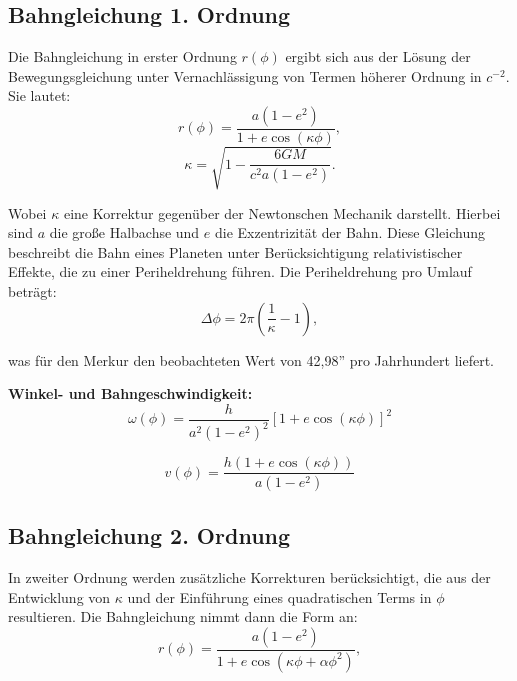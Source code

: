 \subsection{Bahngleichung 1. Ordnung}
Die Bahngleichung in erster Ordnung $r(\phi)$ ergibt sich aus der Lösung der Bewegungsgleichung unter Vernachlässigung von Termen höherer Ordnung in $c^{-2}$. Sie lautet:
\begin{equation}
    \label{eq:weber_r_1_ordnung}
    r(\phi) = \frac{a(1 - e^2)}{1 + e \cos(\kappa \phi)},    
\end{equation}
\begin{equation}
    \kappa = \sqrt{1 - \frac{6GM}{c^2 a(1 - e^2)}}.
\end{equation}

Wobei $\kappa$ eine Korrektur gegenüber der Newtonschen Mechanik darstellt. Hierbei sind $a$ die große Halbachse und $e$ die Exzentrizität der Bahn.
Diese Gleichung beschreibt die Bahn eines Planeten unter Berücksichtigung relativistischer Effekte, die zu einer Periheldrehung führen.
Die Periheldrehung pro Umlauf beträgt:
\begin{equation}
    \Delta \phi = 2\pi \left(\frac{1}{\kappa} - 1\right),
\end{equation}

was für den Merkur den beobachteten Wert von 42,98'' pro Jahrhundert liefert.

\textbf{Winkel- und Bahngeschwindigkeit:}
\begin{equation}
    \omega(\phi) = \frac{h}{a^2(1 - e^2)^2} \left[1 + e \cos(\kappa \phi)\right]^2    
\end{equation}

\begin{equation}
    v(\phi) = \frac{h \left(1 + e \cos(\kappa \phi)\right)}{a(1 - e^2)}
\end{equation}

\subsection{Bahngleichung 2. Ordnung}
In zweiter Ordnung werden zusätzliche Korrekturen berücksichtigt, die aus der Entwicklung von $\kappa$ und der Einführung eines quadratischen Terms in $\phi$ resultieren.
Die Bahngleichung nimmt dann die Form an:
\begin{equation}
    \label{eq:weber_r_2_ordnung}
    r(\phi) = \frac{a(1 - e^2)}{1 + e \cos(\kappa \phi + \alpha \phi^2)},
\end{equation}

